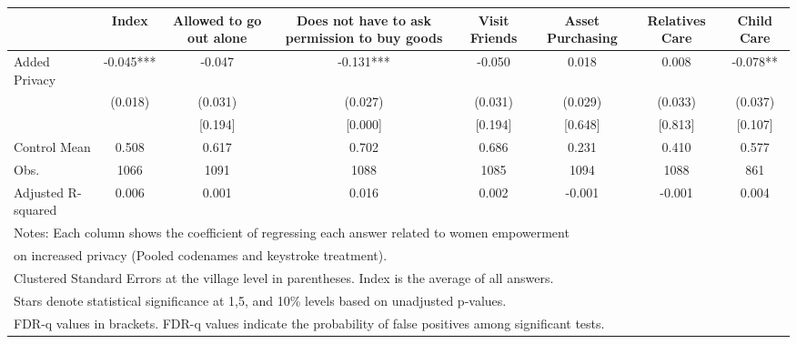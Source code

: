 {
\def\sym#1{\ifmmode^{#1}\else\(^{#1}\)\fi}
\begin{tabular}{l*{7}{c}}
\toprule
                &\multicolumn{1}{c}{Index}&\multicolumn{1}{c}{Allowed to go out alone}&\multicolumn{1}{c}{Does not have to ask permission to buy goods}&\multicolumn{1}{c}{Visit Friends}&\multicolumn{1}{c}{Asset Purchasing}&\multicolumn{1}{c}{Relatives Care}&\multicolumn{1}{c}{Child Care}\\
\midrule
Added Privacy   &   -0.045***&   -0.047   &   -0.131***&   -0.050   &    0.018   &    0.008   &   -0.078** \\
                &  (0.018)   &  (0.031)   &  (0.027)   &  (0.031)   &  (0.029)   &  (0.033)   &  (0.037)   \\
                &            &  [0.194]   &  [0.000]   &  [0.194]   &  [0.648]   &  [0.813]   &  [0.107]   \\
\midrule
Control Mean    &    0.508   &    0.617   &    0.702   &    0.686   &    0.231   &    0.410   &    0.577   \\
Obs.            &     1066   &     1091   &     1088   &     1085   &     1094   &     1088   &      861   \\
Adjusted R-squared&    0.006   &    0.001   &    0.016   &    0.002   &   -0.001   &   -0.001   &    0.004   \\
\bottomrule
\multicolumn{8}{l}{\footnotesize Notes: Each column shows the coefficient of regressing each answer related to women empowerment}\\
\multicolumn{8}{l}{\footnotesize on increased privacy (Pooled codenames and keystroke treatment).}\\
\multicolumn{8}{l}{\footnotesize Clustered Standard Errors at the village level in parentheses. Index is the average of all answers.}\\
\multicolumn{8}{l}{\footnotesize Stars denote statistical significance at 1,5, and 10\% levels based on unadjusted p-values.}\\
\multicolumn{8}{l}{\footnotesize FDR-q values in brackets. FDR-q values indicate the probability of false positives among significant tests.}\\
\end{tabular}
}
